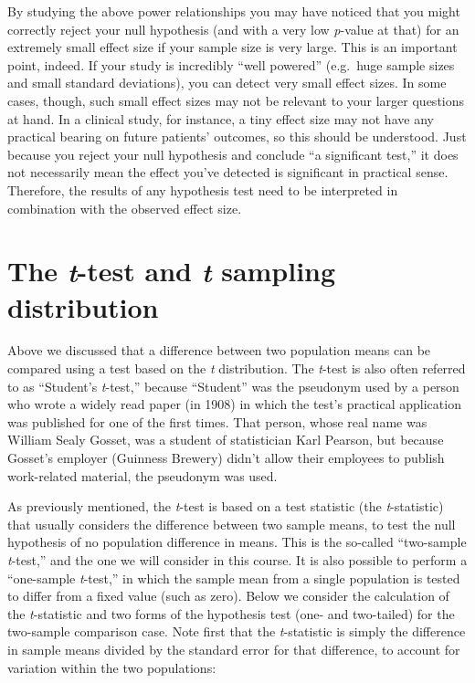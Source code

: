 \documentclass[]{book}
\begin{document}
By studying the above power relationships you may have noticed that you might correctly reject your null hypothesis (and with a very low \emph{p}-value at that) for an extremely small effect size if your sample size is very large. This is an important point, indeed. If your study is incredibly ``well powered'' (e.g.~huge sample sizes and small standard deviations), you can detect very small effect sizes. In some cases, though, such small effect sizes may not be relevant to your larger questions at hand. In a clinical study, for instance, a tiny effect size may not have any practical bearing on future patients' outcomes, so this should be understood. Just because you reject your null hypothesis and conclude ``a significant test,'' it does not necessarily mean the effect you've detected is significant in practical sense. Therefore, the results of any hypothesis test need to be interpreted in combination with the observed effect size.

\hypertarget{the-t-test-and-t-sampling-distribution}{%
\section{\texorpdfstring{The \emph{t}-test and \emph{t} sampling distribution}{The t-test and t sampling distribution}}\label{the-t-test-and-t-sampling-distribution}}

Above we discussed that a difference between two population means can be compared using a test based on the \emph{t} distribution. The \emph{t}-test is also often referred to as ``Student's \emph{t}-test,'' because ``Student'' was the pseudonym used by a person who wrote a widely read paper (in 1908) in which the test's practical application was published for one of the first times. That person, whose real name was William Sealy Gosset, was a student of statistician Karl Pearson, but because Gosset's employer (Guinness Brewery) didn't allow their employees to publish work-related material, the pseudonym was used.

As previously mentioned, the \emph{t}-test is based on a test statistic (the \emph{t}-statistic) that usually considers the difference between two sample means, to test the null hypothesis of no population difference in means. This is the so-called ``two-sample \emph{t}-test,'' and the one we will consider in this course. It is also possible to perform a ``one-sample \emph{t}-test,'' in which the sample mean from a single population is tested to differ from a fixed value (such as zero). Below we consider the calculation of the \emph{t}-statistic and two forms of the hypothesis test (one- and two-tailed) for the two-sample comparison case. Note first that the \emph{t}-statistic is simply the difference in sample means divided by the standard error for that difference, to account for variation within the two populations:
\end{document}
